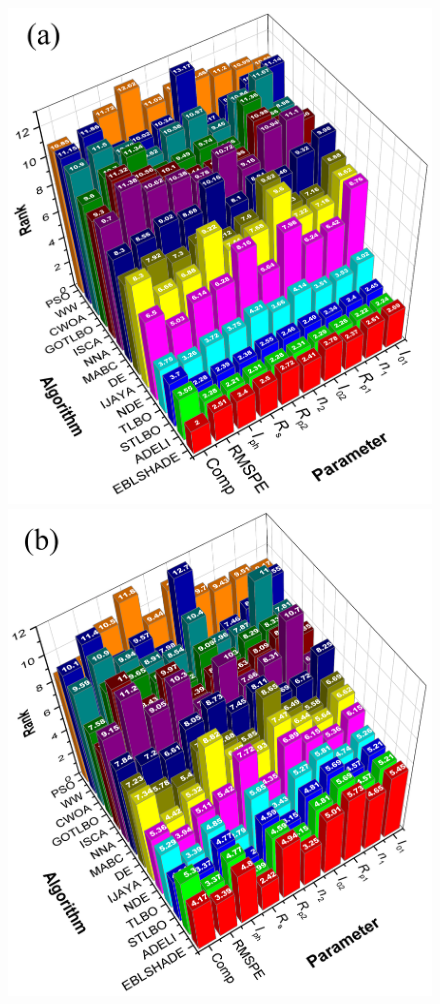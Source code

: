 \documentclass[a4paper,fleqn]{cas-dc}
\begin{document}
\begin{figure}[]
	\centering
		\includegraphics[width=.77\columnwidth]{Friedman}
        \includegraphics[width=.77\columnwidth]{FriedmanAlignedRank}

\end{figure}
\end{document}
